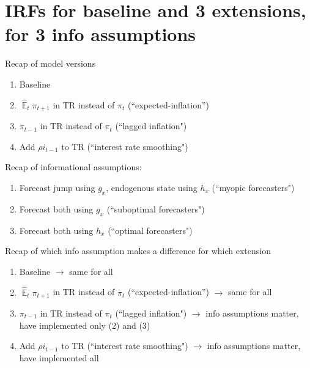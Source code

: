 \documentclass[11pt]{article}
\renewcommand{\[}{\begin{equation}}
\renewcommand{\]}{\end{equation}}
\DeclareMathOperator{\E}{\mathbb{E}}
\begin{document}
\section{IRFs for baseline and 3 extensions, for 3 info assumptions}

Recap of model versions 
\begin{enumerate}
\item Baseline
\item $\hat{\E}_t\pi_{t+1}$ in TR instead of $\pi_t$ (``expected-inflation'')
\item $\pi_{t-1}$ in TR instead of $\pi_t$ (``lagged inflation")
\item Add $\rho i_{t-1}$ to TR (``interest rate smoothing")
\end{enumerate}

\noindent Recap of informational assumptions:
\begin{enumerate}
\item Forecast jump using $g_x$, endogenous state using $h_x$ (``myopic forecasters")
\item Forecast both using $g_x$ (``suboptimal forecasters")
\item Forecast both using $h_x$ (``optimal forecasters")
\end{enumerate}

\noindent Recap of which info assumption makes a difference for which extension
\begin{enumerate}
\item Baseline $\rightarrow$ same for all
\item $\hat{\E}_t\pi_{t+1}$ in TR instead of $\pi_t$ (``expected-inflation'') $\rightarrow$ same for all
\item $\pi_{t-1}$ in TR instead of $\pi_t$ (``lagged inflation") $\rightarrow$ info assumptions matter, have implemented only (2) and (3)
\item Add $\rho i_{t-1}$ to TR (``interest rate smoothing") $\rightarrow$ info assumptions matter, have implemented all
\end{enumerate}
\end{document}
